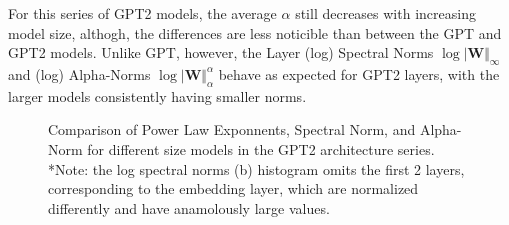 For this series of GPT2 models, the average $\alpha$ still decreases with increasing model size,
althogh, the differences are less noticible than between the GPT and GPT2 models.
Unlike GPT, however, the Layer (log) Spectral Norms $\log\vert\mathbf{W}\Vert_{\infty}$ 
and (log) Alpha-Norms $\log\vert\mathbf{W}\Vert_{\alpha}^{\alpha}$
 behave  as expected for GPT2 layers, with the larger models  consistently having  smaller norms. 

\begin{figure}[t]
    \centering

    \qquad
    \qquad
    \caption{Comparison of Power Law Exponnents, Spectral Norm, and Alpha-Norm for different size models in the GPT2 architecture series.  *Note: the log spectral norms (b) histogram omits the first 2 layers, corresponding to the embedding layer, which are normalized differently and have anamolously large values.}
    \label{fig:gpt-alpha-layers}
\end{figure}




